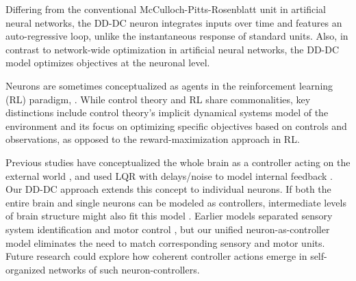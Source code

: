 \documentclass[9pt,twocolumn,twoside]{pnas-new}
\begin{document}
Differing from the conventional McCulloch-Pitts-Rosenblatt unit in artificial neural networks, the DD-DC neuron integrates inputs over time and features an auto-regressive loop, unlike the instantaneous response of standard units. Also, in contrast to network-wide optimization in artificial neural networks, the DD-DC model optimizes objectives at the neuronal level.

Neurons are sometimes conceptualized as agents in the reinforcement learning (RL) paradigm, \citep{sutton2018reinforcement,dayan2002matters}. While control theory and RL share commonalities, key distinctions include control theory's implicit dynamical systems model of the environment and its focus on optimizing specific objectives based on controls and observations, as opposed to the reward-maximization approach in RL.

Previous studies have conceptualized the whole brain as a controller acting on the external world \citep{cisek1999beyond,cisek2010neural,ahissar2016perception}, and used LQR with delays/noise to model internal feedback \citep{li2022internal}. Our DD-DC approach extends this concept to individual neurons. If both the entire brain and single neurons can be modeled as controllers, intermediate levels of brain structure might also fit this model \citep{robinson1981use,miles1981plasticity}. Earlier models separated sensory system identification and motor control \citep{haruno2001mosaic}, but our unified neuron-as-controller model eliminates the need to match corresponding sensory and motor units. Future research could explore how coherent controller actions emerge in self-organized networks of such neuron-controllers.





\pagebreak


\end{document}

